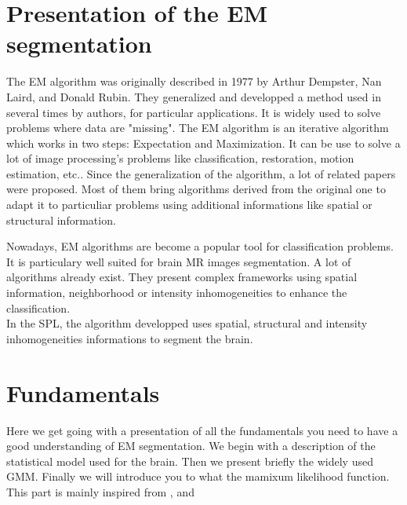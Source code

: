 \section{Presentation of the EM segmentation}
The EM algorithm was originally described in 1977 by Arthur Dempster, Nan Laird, and Donald Rubin\cite{1}. They generalized and developped a method used in several times by authors, for particular applications. It is widely used to solve problems where data are "missing". %
The EM algorithm is an iterative algorithm which works in two steps: Expectation and Maximization. It can be use to solve a lot of image processing's problems like classification, restoration\cite{3}, motion estimation\cite{2}, etc.. 
Since the generalization of the algorithm, a lot of related papers were proposed. Most of them bring algorithms derived from the original one to adapt it to particuliar problems using additional informations like spatial or structural information.
\par
Nowadays, EM algorithms are become a popular tool for classification problems.  It is particulary well suited for brain MR images segmentation.
A lot of algorithms already exist. They present complex frameworks using spatial information, neighborhood or intensity inhomogeneities to enhance the classification.\\
In the SPL, the algorithm developped uses spatial, structural and intensity inhomogeneities informations to segment the brain. 
%

\section{Fundamentals}
%
Here we get going with a presentation of all the fundamentals you need to have a good understanding of EM segmentation. We begin with a description of the statistical model used for the brain. Then we present briefly the widely used GMM. Finally we will introduce you to what the mamixum likelihood function. This part is mainly inspired from \cite{4}, \cite{5} and \cite{6}
%
